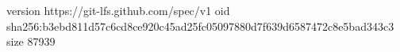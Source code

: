 version https://git-lfs.github.com/spec/v1
oid sha256:b3ebd811d57c6cd8ce920c45ad25fc05097880d7f639d6587472c8e5bad343c3
size 87939
